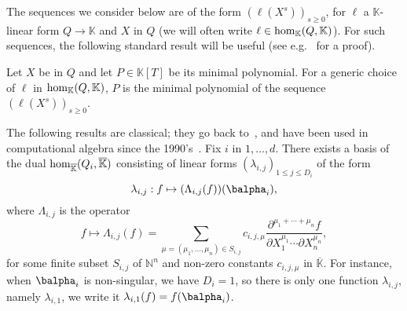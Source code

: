 \documentclass[12pt]{article}
\newcommand{\lf}{X}
\def\N {\ensuremath{\mathbb{N}}}
\def\K{\mathbb{K}}
\def\K {\ensuremath{\mathbb{K}}}
\def\Kbar {{\ensuremath{\overline{\mathbb{K}}}}}
\def\D {\ensuremath{D}}
\begin{document}
The sequences we consider below are of the form $(\ell(\lf^s))_{s \ge
  0}$, for $\ell$ a $\K$-linear form $Q \to \K$ and $\lf$ in $Q$
(we will often write $\ell \in {\rm hom}_\K(Q,\K)$). For
such sequences, the following standard result will be useful
(see e.g.~\cite[Proposition~1 \& 2]{BoSaSc03} for a proof).
\begin{lemma}\label{lemma:minpoly}
  Let $\lf$ be in $Q$ and let $P \in \K[T]$ be its minimal
  polynomial. For a generic choice of $\ell$ in ${\rm hom}_\K(Q,\K)$,
  $P$ is the minimal polynomial of the sequence $(\ell(\lf^s))_{s \ge
    0}$.
\end{lemma}

The following results are classical; they go back
to~\cite{Macaulay16}, and have been used in computational algebra
since the 1990's~\cite{MaMoMo96,Mourrain97}. Fix $i$ in $1,\dots,d$.
There exists a basis of the dual ${\rm hom}_\Kbar(Q_i,\Kbar)$
consisting of linear forms $(\lambda_{i,j})_{1\le j \le \D_i}$ of the
form
$$\lambda_{i,j}: f \mapsto (\Lambda_{i,j}(f))(\balpha_i),$$
where $\Lambda_{i,j}$ is the operator
$$f \mapsto \Lambda_{i,j}(f) = \sum_{\mu=(\mu_1,\dots,\mu_n) \in
	S_{i,j}} c_{i,j,\mu} \frac{ \partial^{\mu_1 + \cdots + \mu_n} f}
{\partial X_1^{\mu_1} \cdots \partial X_n^{\mu_n}},$$ for some finite
subset $S_{i,j}$ of $\N^n$ and non-zero constants $c_{i,j,\mu}$ in
$\Kbar$. 
For instance, when $\balpha_i$ is non-singular, we have $D_i=1$, so
there is only one function $\lambda_{i,j}$, namely $\lambda_{i,1}$, we
write it $\lambda_{i,1}(f) = f(\balpha_i)$.
\end{document}
